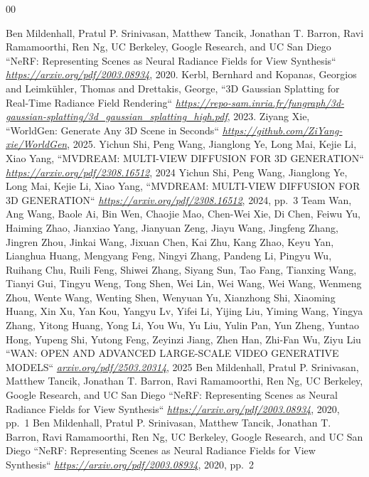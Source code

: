 \documentclass[conference]{IEEEtran}
\begin{document}
\begin{thebibliography}{00}

 Ben Mildenhall, Pratul P. Srinivasan, Matthew Tancik,
Jonathan T. Barron, Ravi Ramamoorthi, Ren Ng, UC Berkeley, Google Research, and UC San Diego ``NeRF: Representing Scenes as Neural Radiance Fields for View Synthesis`` \emph{\url{https://arxiv.org/pdf/2003.08934}}, 2020.
 Kerbl, Bernhard and Kopanas, Georgios and Leimk{\"u}hler, Thomas and Drettakis, George, ``3D Gaussian Splatting for Real-Time Radiance Field Rendering`` \emph{\url{https://repo-sam.inria.fr/fungraph/3d-gaussian-splatting/3d_gaussian_splatting_high.pdf}}, 2023.
 Ziyang Xie, ``WorldGen: Generate Any 3D Scene in Seconds`` \emph{\url{https://github.com/ZiYang-xie/WorldGen}}, 2025.
 Yichun Shi, Peng Wang, Jianglong Ye, Long Mai, Kejie Li, Xiao Yang, ``MVDREAM: MULTI-VIEW DIFFUSION FOR 3D GENERATION`` \emph{\url{https://arxiv.org/pdf/2308.16512}}, 2024
 Yichun Shi, Peng Wang, Jianglong Ye, Long Mai, Kejie Li, Xiao Yang, ``MVDREAM: MULTI-VIEW DIFFUSION FOR 3D GENERATION`` \emph{\url{https://arxiv.org/pdf/2308.16512}}, 2024, pp.~3
 Team Wan, Ang Wang, Baole Ai, Bin Wen, Chaojie Mao, Chen-Wei Xie, Di Chen, Feiwu Yu, Haiming Zhao, Jianxiao Yang, Jianyuan Zeng, Jiayu Wang, Jingfeng Zhang, Jingren Zhou, Jinkai Wang, Jixuan Chen, Kai Zhu, Kang Zhao, Keyu Yan, Lianghua Huang, Mengyang Feng, Ningyi Zhang, Pandeng Li, Pingyu Wu, Ruihang Chu, Ruili Feng, Shiwei Zhang, Siyang Sun, Tao Fang, Tianxing Wang, Tianyi Gui, Tingyu Weng, Tong Shen, Wei Lin, Wei Wang, Wei Wang, Wenmeng Zhou, Wente Wang, Wenting Shen, Wenyuan Yu, Xianzhong Shi, Xiaoming Huang, Xin Xu, Yan Kou, Yangyu Lv, Yifei Li, Yijing Liu, Yiming Wang, Yingya Zhang, Yitong Huang, Yong Li, You Wu, Yu Liu, Yulin Pan, Yun Zheng, Yuntao Hong, Yupeng Shi, Yutong Feng, Zeyinzi Jiang, Zhen Han, Zhi-Fan Wu, Ziyu Liu ``WAN: OPEN AND ADVANCED LARGE-SCALE VIDEO GENERATIVE MODELS`` \emph{\url{arxiv.org/pdf/2503.20314}}, 2025
 Ben Mildenhall, Pratul P. Srinivasan, Matthew Tancik,
Jonathan T. Barron, Ravi Ramamoorthi, Ren Ng, UC Berkeley, Google Research, and UC San Diego ``NeRF: Representing Scenes as Neural Radiance Fields for View Synthesis`` \emph{\url{https://arxiv.org/pdf/2003.08934}}, 2020, pp.~1
 Ben Mildenhall, Pratul P. Srinivasan, Matthew Tancik,
Jonathan T. Barron, Ravi Ramamoorthi, Ren Ng, UC Berkeley, Google Research, and UC San Diego ``NeRF: Representing Scenes as Neural Radiance Fields for View Synthesis`` \emph{\url{https://arxiv.org/pdf/2003.08934}}, 2020, pp.~2

\end{thebibliography}
\end{document}
